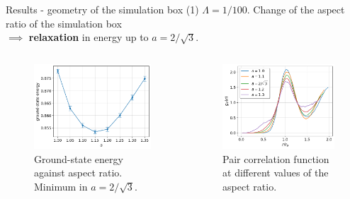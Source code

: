 \documentclass{beamer}
\begin{document}
\begin{frame}{Results - geometry of the simulation box (1)}
  $\Lambda = 1/100$. Change of the aspect ratio of the simulation box \\
  $\implies$ \textbf{relaxation} in energy up to $a=2/\sqrt{3}$.
  \begin{columns}
    \begin{column}{0.5\textwidth}
      \begin{figure}[H]
          \centering
          \includegraphics[width=1.0\textwidth]{figures/gs_energy_against_a_iters=2000.png}
          \caption{Ground-state energy against aspect ratio. Minimum in $a=2/\sqrt{3}$.}
      \end{figure}
    \end{column}

    \begin{column}{0.5\textwidth}
    \begin{figure}[H]
          \centering
          \includegraphics[width=1.0\textwidth]{figures/corr_func_diff_a_2.png}
          \caption{Pair correlation function at different values of the aspect ratio.}
    \end{figure}
    \end{column}
  \end{columns}
\end{frame}
\end{document}
